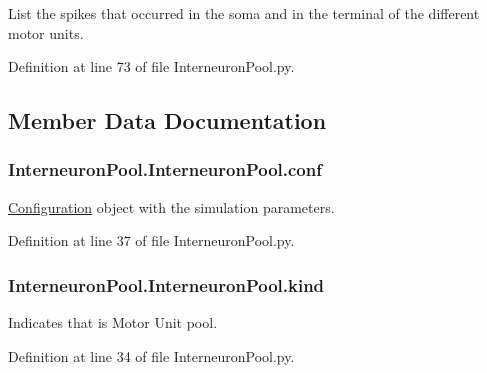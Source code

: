 List the spikes that occurred in the soma and in the terminal of the different motor units. 



Definition at line 73 of file Interneuron\+Pool.\+py.



\subsection{Member Data Documentation}
\subsubsection[{\texorpdfstring{conf}{conf}}]{\setlength{\rightskip}{0pt plus 5cm}Interneuron\+Pool.\+Interneuron\+Pool.\+conf}\hypertarget{class_interneuron_pool_1_1_interneuron_pool_a2418c4def3edaa2e5cd7514df52499d5}{}\label{class_interneuron_pool_1_1_interneuron_pool_a2418c4def3edaa2e5cd7514df52499d5}


\hyperlink{namespace_configuration}{Configuration} object with the simulation parameters. 



Definition at line 37 of file Interneuron\+Pool.\+py.

\subsubsection[{\texorpdfstring{kind}{kind}}]{\setlength{\rightskip}{0pt plus 5cm}Interneuron\+Pool.\+Interneuron\+Pool.\+kind}\hypertarget{class_interneuron_pool_1_1_interneuron_pool_a55b3665ce98a5d6f3937dac3df5afa40}{}\label{class_interneuron_pool_1_1_interneuron_pool_a55b3665ce98a5d6f3937dac3df5afa40}


Indicates that is Motor Unit pool. 



Definition at line 34 of file Interneuron\+Pool.\+py.

